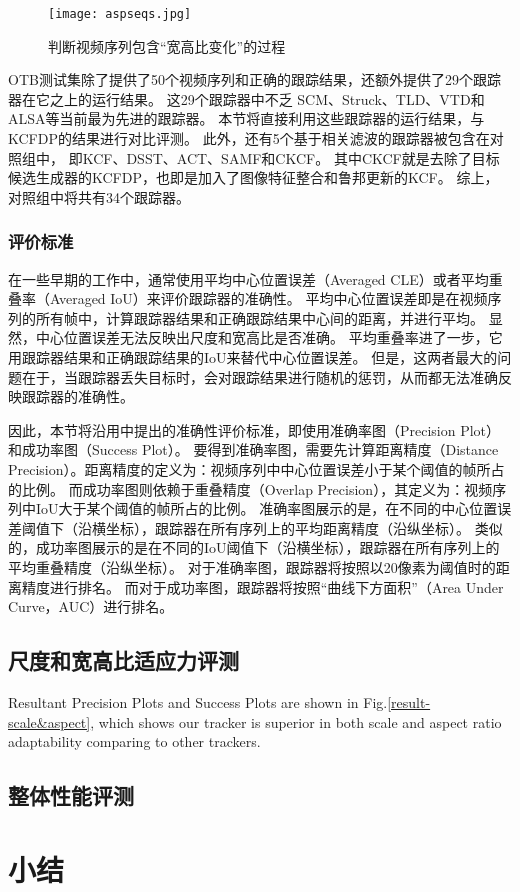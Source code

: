 \begin{figure}[htb]
	\centering
		\texttt{[image: aspseqs.jpg]}
	\caption{判断视频序列包含``宽高比变化''的过程}
	\label{aspseqs}
\end{figure}

OTB测试集除了提供了50个视频序列和正确的跟踪结果，还额外提供了29个跟踪器在它之上的运行结果。
这29个跟踪器中不乏
SCM、Struck、TLD、VTD和ALSA等当前最为先进的跟踪器。
本节将直接利用这些跟踪器的运行结果，与KCFDP的结果进行对比评测。
此外，还有5个基于相关滤波的跟踪器被包含在对照组中，
即KCF、DSST、ACT、SAMF和CKCF。
其中CKCF就是去除了目标候选生成器的KCFDP，也即是加入了图像特征整合和鲁邦更新的KCF。
综上，对照组中将共有34个跟踪器。

\subsubsection{评价标准}
在一些早期的工作中，通常使用平均中心位置误差（Averaged CLE）或者平均重叠率（Averaged IoU）来评价跟踪器的准确性。
平均中心位置误差即是在视频序列的所有帧中，计算跟踪器结果和正确跟踪结果中心间的距离，并进行平均。
显然，中心位置误差无法反映出尺度和宽高比是否准确。
平均重叠率进了一步，它用跟踪器结果和正确跟踪结果的IoU来替代中心位置误差。
但是，这两者最大的问题在于，当跟踪器丢失目标时，会对跟踪结果进行随机的惩罚，从而都无法准确反映跟踪器的准确性。

因此，本节将沿用\cite{50seqs}中提出的准确性评价标准，即使用准确率图（Precision Plot）和成功率图（Success Plot）。
要得到准确率图，需要先计算距离精度（Distance Precision）。距离精度的定义为：视频序列中中心位置误差小于某个阈值的帧所占的比例。
而成功率图则依赖于重叠精度（Overlap Precision），其定义为：视频序列中IoU大于某个阈值的帧所占的比例。
准确率图展示的是，在不同的中心位置误差阈值下（沿横坐标），跟踪器在所有序列上的平均距离精度（沿纵坐标）。
类似的，成功率图展示的是在不同的IoU阈值下（沿横坐标），跟踪器在所有序列上的平均重叠精度（沿纵坐标）。
对于准确率图，跟踪器将按照以20像素为阈值时的距离精度进行排名。
而对于成功率图，跟踪器将按照``曲线下方面积''（Area Under Curve，AUC）进行排名。

\subsection{尺度和宽高比适应力评测}
Resultant Precision Plots and Success Plots are shown in Fig.\ref{result-scale&aspect}, which shows our tracker is superior in both
scale and aspect ratio adaptability comparing to other trackers.


\subsection{整体性能评测}

\section{小结}
